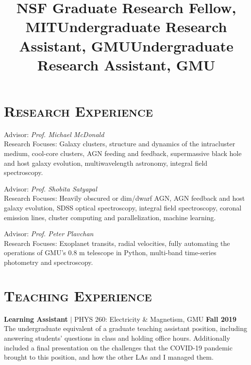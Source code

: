 \documentclass[marg, centered]{res}
\begin{document}
\begin{resume}
\section{{\scshape \bfseries Research Experience}}

\title{\textbf{NSF Graduate Research Fellow}, MIT}
\begin{position}
Advisor: \textit{Prof. Michael McDonald} \\
{\small Research Focuses: Galaxy clusters, structure and dynamics of the intracluster medium, cool-core clusters, AGN feeding and feedback, supermassive black hole and host galaxy evolution, multiwavelength astronomy, integral field spectroscopy.}
\end{position}

\vspace{-0.2cm}
\title{\textbf{Undergraduate Research Assistant}, GMU}
\begin{position}
Advisor: \textit{Prof. Shobita Satyapal} \\
{\small Research Focuses: Heavily obscured or dim/dwarf AGN, AGN feedback and host galaxy evolution, SDSS optical spectroscopy, integral field spectroscopy, coronal emission lines, cluster computing and parallelization, machine learning.} 
\end{position}

\vspace{-0.2cm}
\title{\textbf{Undergraduate Research Assistant}, GMU}
\begin{position}
Advisor: \textit{Prof. Peter Plavchan} \\
{\small Research Focuses: Exoplanet transits, radial velocities, fully automating the operations of GMU's 0.8 m telescope in Python, multi-band time-series photometry and spectroscopy.}
\end{position}

\section{{\scshape \bfseries Teaching Experience}}

{\textbf{Learning Assistant} $|$ PHYS 260: Electricity \& Magnetism, GMU \hfill \textbf{Fall 2019}} \\
{\small The undergraduate equivalent of a graduate teaching assistant position, including answering students' questions in class and holding office hours. Additionally included a final presentation on the challenges that the COVID-19 pandemic brought to this position, and how the other LAs and I managed them.}


\end{resume}
\end{document}
